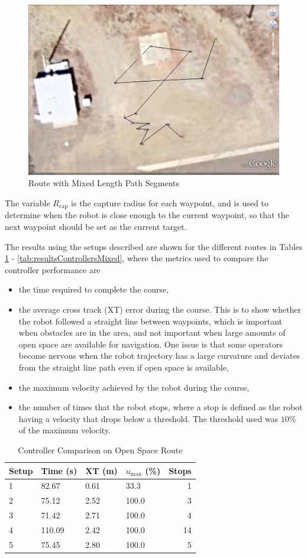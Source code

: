 \begin{itemize}
\begin{figure}[ht!]
	\centering
	\includegraphics[width=.5\textwidth]{images/GE/GEMixedSegmentsRoute2}
	\caption{Route with Mixed Length Path Segments}
	\label{fig:routeMixed}
\end{figure}
\end{itemize}
The variable $R_{\text{cap}}$ is the capture radius for each waypoint, and is used to determine when the robot is close enough to the current waypoint, so that the next waypoint should be set as the current target.

The results using the setups described are shown for the different routes in Tables \ref{tab:resultsControllersOpenSpace} - \ref{tab:resultsControllersMixed}, where the metrics used to compare the controller performance are
\begin{itemize}
\item the time required to complete the course,
\item the average cross track (XT) error during the course. This is to show whether the robot followed a straight line between waypoints, which is important when obstacles are in the area, and not important when large amounts of open space are available for navigation. One issue is that some operators become nervous when the robot trajectory has a large curvature and deviates from the straight line path even if open space is available,
\item the maximum velocity achieved by the robot during the course,
\item the number of times that the robot stops, where a stop is defined as the robot having a velocity that drops below a threshold. The threshold used was $10\%$ of the maximum velocity.
\end{itemize}

\begin{table}[ht!]
\caption{Controller Comparison on Open Space Route}
\small
\centering
\begin{tabular}{@{}llllr@{}} \toprule
Setup & Time (s) & XT (m) & $u_{\text{max}}$ (\%) & Stops \\ \midrule
1     & 82.67    & 0.61   & 33.3                  & 1     \\
2     & 75.12    & 2.52   & 100.0                 & 3     \\
3     & 71.42    & 2.71   & 100.0                 & 4     \\
4     & 110.09   & 2.42   & 100.0                 & 14    \\
5     & 75.45    & 2.80   & 100.0                 & 5     \\ \bottomrule
\end{tabular}
\label{tab:resultsControllersOpenSpace}
\end{table}

